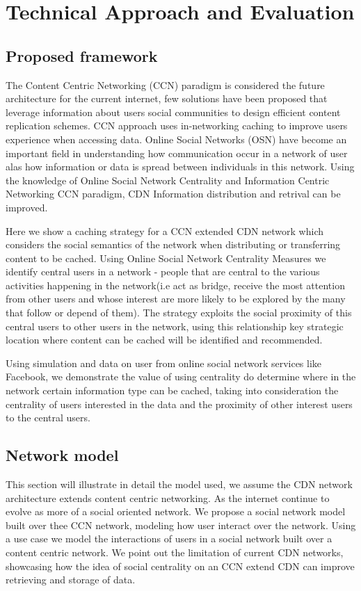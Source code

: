 \chapter{Technical Approach and Evaluation}



\section{Proposed framework }
The Content Centric Networking (CCN) paradigm is considered the future architecture for the current internet, few solutions have been proposed that leverage information about  users  social communities to design efficient content replication schemes. 
CCN approach uses in-networking caching to improve users experience when accessing data.  Online Social Networks (OSN) have become an important field in understanding how communication occur in a network of user alas how information or data is spread between individuals in this network.  Using the knowledge of Online Social Network Centrality and Information Centric Networking CCN paradigm, CDN Information distribution and retrival can be improved.

Here we show a caching strategy for a CCN extended CDN network which considers the social semantics of the network when distributing or transferring content to be cached. Using Online Social Network Centrality Measures we identify central users in a network - people that are central to the various activities happening in the network(i.e act as bridge, receive the most attention from other users and whose interest are more likely to be explored by the many that follow or depend of them). The strategy exploits the social proximity of this central users to other users in the network, using this relationship key strategic location where content can be cached will be identified and recommended. 

Using simulation and data on user from online social network services like Facebook, we demonstrate the value of using centrality do determine where in the network certain information type can be cached, taking into consideration the centrality of users interested in the data and the proximity of other interest users to the central users.


\section{Network model}
This section will illustrate in detail the model used, we assume the CDN network architecture extends content centric networking. As the internet continue to evolve as more of a social oriented network. We propose a social network model built over thee CCN network, modeling how user interact over the network. Using a use case we model the interactions of users in a social network built over a content centric network. We point out the limitation of current CDN networks, showcasing how the idea of social centrality on an CCN extend CDN can improve retrieving and storage of data. 


